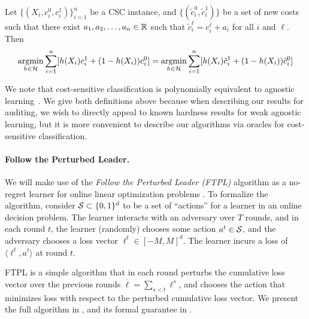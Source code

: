 \begin{claim}
\label{claim:csc}
  Let $\{(X_i, c_i^0, c_i^1)\}_{i=1}^n$ be a CSC instance, and
  $\{(\tilde c_i^0, \tilde c_i^1)\}$ be a set of new costs such that
  there exist $a_1, a_2,\ldots, a_n\in \mathbb{R}$ such that
  $\tilde c_i^\ell = c_i^\ell + a_i$ for all $i$ and $\ell$. Then
\[
  \operatorname*{\mathrm{argmin}}_{h\in \mathcal{H}} \sum_{i = 1}^n [h(X_i) c_i^1 + (1 - h(X_i))
  c_i^0] = \operatorname*{\mathrm{argmin}}_{h\in \mathcal{H}} \sum_{i = 1}^n [h(X_i) \tilde c_i^1 + (1
  - h(X_i)) \tilde c_i^0]
\]
\end{claim}

\begin{remark}
  We note that cost-sensitive classification is polynomially
  equivalent to agnostic learning~\cite{ZLA03}.  We give both
  definitions above because when describing our results for auditing,
  we wish to directly appeal to known hardness results for weak
  agnostic learning, but it is more convenient to describe our
  algorithms via oracles for cost-sensitive classification.
\end{remark} %

\paragraph{Follow the Perturbed Leader.}

We will make use of the \emph{Follow the Perturbed Leader (FTPL)}
algorithm as a no-regret learner for online linear optimization
problems \citep{KV05}.  To formalize the algorithm, consider
$\mathcal{S} \subset \{0, 1\}^d$ to be a set of ``actions'' for a learner  in an online decision problem. The
learner interacts with an adversary over $T$ rounds, and in each round
$t$, the learner (randomly) chooses some action $a^t \in \mathcal{S}$, and the
adversary chooses a loss vector $\ell^t \in [-M , M]^d$. The learner incurs a loss of $\langle \ell^t, a^t \rangle$ at round $t$.

FTPL is a simple algorithm that in each round perturbs the cumulative
loss vector over the previous rounds
$\overline \ell = \sum_{s< t} \ell^s$, and chooses the action that
minimizes loss with respect to the perturbed cumulative loss vector. We present the full
algorithm in , and its formal guarantee in
.


